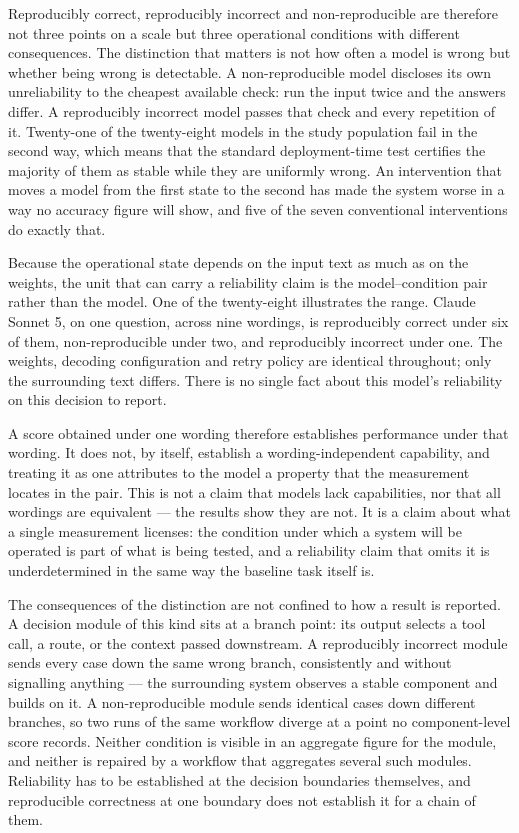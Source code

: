 Reproducibly correct, reproducibly incorrect and non-reproducible are therefore not
three points on a scale but three operational conditions with different consequences.
The distinction that matters is not how often a model is wrong but whether being
wrong is detectable. A non-reproducible model discloses its own unreliability to
the cheapest available check: run the input twice and the answers differ. A
reproducibly incorrect model passes that check and every repetition of it. Twenty-one
of the twenty-eight models in the study population fail in the second way, which
means that the standard deployment-time test certifies the majority of them as
stable while they are uniformly wrong. An intervention that moves a model from the
first state to the second has made the system worse in a way no accuracy figure
will show, and five of the seven conventional interventions do exactly that.

Because the operational state depends on the input text as much as on the weights,
the unit that can carry a reliability claim is the model--condition pair rather than
the model. One of the twenty-eight illustrates the range. Claude Sonnet 5, on one
question, across nine wordings, is reproducibly correct under six of them,
non-reproducible under two, and reproducibly incorrect under one. The weights,
decoding configuration and retry policy are identical throughout; only the
surrounding text differs. There is no single fact about this model's reliability on
this decision to report.

A score obtained under one wording therefore establishes performance under that
wording. It does not, by itself, establish a wording-independent capability, and
treating it as one attributes to the model a property that the measurement locates
in the pair. This is not a claim that models lack capabilities, nor that all
wordings are equivalent --- the results show they are not. It is a claim about what a
single measurement licenses: the condition under which a system will be operated is
part of what is being tested, and a reliability claim that omits it is
underdetermined in the same way the baseline task itself is.


The consequences of the distinction are not confined to how a result is reported. A
decision module of this kind sits at a branch point: its output selects a tool call,
a route, or the context passed downstream. A reproducibly incorrect module sends
every case down the same wrong branch, consistently and without signalling
anything --- the surrounding system observes a stable component and builds on it. A
non-reproducible module sends identical cases down different branches, so two runs
of the same workflow diverge at a point no component-level score records. Neither
condition is visible in an aggregate figure for the module, and neither is repaired
by a workflow that aggregates several such modules. Reliability has to be
established at the decision boundaries themselves, and reproducible correctness at
one boundary does not establish it for a chain of them.

